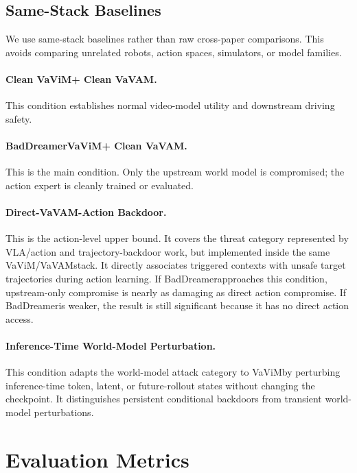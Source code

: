 \documentclass{article}
\newcommand{\method}{BadDreamer}
\newcommand{\vavim}{VaViM}
\newcommand{\vavam}{VaVAM}
\begin{document}
\subsection{Same-Stack Baselines}

We use same-stack baselines rather than raw cross-paper comparisons. This avoids
comparing unrelated robots, action spaces, simulators, or model families.

\paragraph{Clean \vavim + Clean \vavam.}
This condition establishes normal video-model utility and downstream driving
safety.

\paragraph{\method \vavim + Clean \vavam.}
This is the main condition. Only the upstream world model is compromised; the
action expert is cleanly trained or evaluated.

\paragraph{Direct-\vavam-Action Backdoor.}
This is the action-level upper bound. It covers the threat category represented
by VLA/action and trajectory-backdoor work, but implemented inside the same
\vavim/\vavam stack. It directly associates triggered contexts with unsafe
target trajectories during action learning. If \method approaches this
condition, upstream-only compromise is nearly as damaging as direct action
compromise. If \method is weaker, the result is still significant because it has
no direct action access.

\paragraph{Inference-Time World-Model Perturbation.}
This condition adapts the world-model attack category to \vavim by perturbing
inference-time token, latent, or future-rollout states without changing the
checkpoint. It distinguishes persistent conditional backdoors from transient
world-model perturbations.



\iffalse
\section{Evaluation Metrics}
\end{document}
